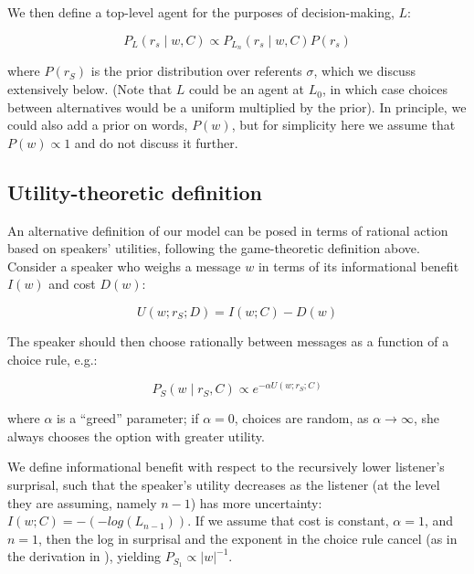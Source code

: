 \documentclass[man,noapacite]{apa2}
\begin{document}
We then define a top-level agent for the purposes of decision-making, $L$:

\begin{equation}
P_L (r_s \mid w, C) \propto P_{L_n} (r_s \mid w, C) P(r_s)
\end{equation}

\noindent where $P(r_S)$ is the prior distribution over referents $\sigma$, which we discuss extensively below. (Note that $L$ could be an agent at $L_0$, in which case choices between alternatives would be a uniform multiplied by the prior). In principle, we could also add a prior on words, $P(w)$, but for simplicity here we assume that $P(w) \propto 1$ and do not discuss it further.

\subsection{Utility-theoretic definition}

An alternative definition of our model can be posed in terms of rational action based on speakers' utilities, following the game-theoretic definition above. Consider a speaker who weighs a message $w$ in terms of its informational benefit $I(w)$ and cost $D(w)$:

\begin{equation}
U(w; r_S; D) = I(w; C) - D(w)
\end{equation}

\noindent The speaker should then choose rationally between messages as a function of a choice rule, e.g.:

\begin{equation}
P_S(w \mid r_S, C) \propto e^{-\alpha U(w;r_S; C)}
\end{equation}

\noindent where $\alpha$ is a ``greed'' parameter; if $\alpha=0$, choices are random, as $\alpha \rightarrow \infty$, she always chooses the option with greater utility.

We define informational benefit with respect to the recursively lower listener's surprisal, such that the speaker's utility decreases as the listener (at the level they are assuming, namely $n-1$) has more uncertainty: $I(w; C) = -(-log(L_{n-1}))$. If we assume that cost is constant, $\alpha=1$, and $n=1$, then the log in surprisal and the exponent in the choice rule cancel (as in the derivation in ), yielding $P_{S_1} \propto |w|^{-1}$.
\end{document}
